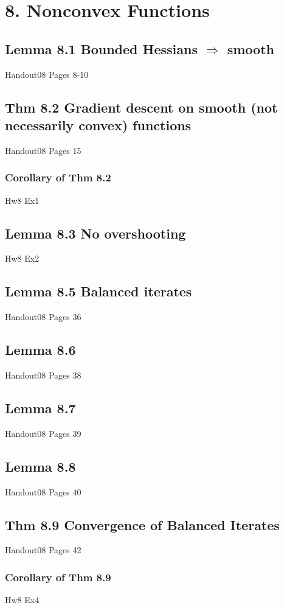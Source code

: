 \section*{8. Nonconvex Functions}
\subsection*{Lemma 8.1 Bounded Hessians $\Rightarrow$ smooth}
Handout08 Pages 8-10


\subsection*{Thm 8.2 Gradient descent on smooth (not necessarily convex) functions}
Handout08 Pages 15

\subsubsection*{Corollary of Thm 8.2}
Hw8 Ex1

\subsection*{Lemma 8.3 No overshooting}
Hw8 Ex2

\subsection*{Lemma 8.5 Balanced iterates}
Handout08 Pages 36


\subsection*{Lemma 8.6}
Handout08 Pages 38

\subsection*{Lemma 8.7}
Handout08 Pages 39


\subsection*{Lemma 8.8}
Handout08 Pages 40


\subsection*{Thm 8.9 Convergence of Balanced Iterates}
Handout08 Pages 42


\subsubsection*{Corollary of Thm 8.9}
Hw8 Ex4